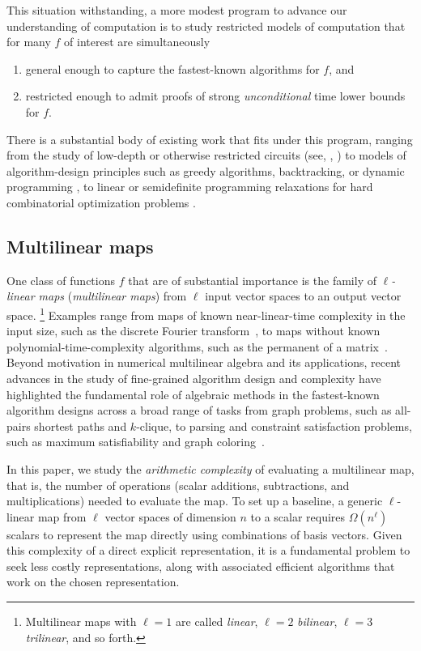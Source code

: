 \documentclass{toc}
\begin{document}
This situation withstanding, a more modest program to advance our
understanding of computation is to study restricted models of computation
that for many $f$ of interest are simultaneously
\begin{enumerate}%
\item
general enough to capture the fastest-known algorithms for
$f$, and
\item
restricted enough to admit proofs of strong \emph{unconditional} time
lower bounds for $f$.
\end{enumerate}
There is a substantial body of existing work that fits under this program,
ranging from the study of low-depth or otherwise restricted circuits
%
(see, \eg, \cite[Ch. 14]{AroraB2009})  %
to models of algorithm-design principles such as greedy algorithms,
backtracking, or dynamic programming
\cite{AlekhnovichBBIMP2011,DavisI2009}, to linear or semidefinite
programming relaxations for hard combinatorial optimization problems
\cite{LeeRS2015}.

\subsection{Multilinear maps}

One class of functions $f$ that are of substantial importance is the family of \emph{$\ell$-linear maps} (\emph{multilinear maps}) from $\ell$ input vector spaces to an output vector space.%
\footnote{Multilinear maps with $\ell=1$ are called \emph{linear}, $\ell=2$ \emph{bilinear}, $\ell=3$ \emph{trilinear}, and so forth.}{}
Examples range from maps of known near-linear-time complexity in the input size, such as the discrete Fourier transform~\cite{CooleyT1965,VanLoan1992}, to maps without known polynomial-time-complexity algorithms, such as the permanent of a matrix~\cite{Ryser1963,Valiant1979}. Beyond motivation in numerical multilinear algebra and its applications, recent advances in the study of fine-grained algorithm design and complexity have highlighted the fundamental role of algebraic methods in the fastest-known algorithm designs across a broad range of tasks from graph problems, such as all-pairs shortest paths and $k$-clique, to parsing and constraint satisfaction problems, such as maximum satisfiability and graph coloring~\cite{AbboudBW15a,BjorklundHKK2008,BjorklundHK2009,EisenbrandG2004,ItaiR1978,Nesetril1985,Williams2005,Williams14apsp}.

In this paper, we study the \emph{arithmetic complexity} of evaluating
a multilinear map, that is, the number of operations (scalar additions,
subtractions, and multiplications) needed to evaluate the map.
To set up a baseline, a generic $\ell$-linear map from $\ell$ vector spaces
of dimension $n$ to a scalar requires $\Omega(n^\ell)$ scalars to represent
the map directly using combinations of basis vectors. Given this
complexity of a direct explicit representation, it is a fundamental
problem to seek less costly representations, along with associated
efficient algorithms that work on the chosen representation.
\end{document}
